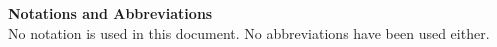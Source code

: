 

\clearpage %


\noindent

{\Huge{\bf{Notations and Abbreviations}}}\
\\[6pt] 




No notation is used in this document. No abbreviations have been used either.

\newpage





